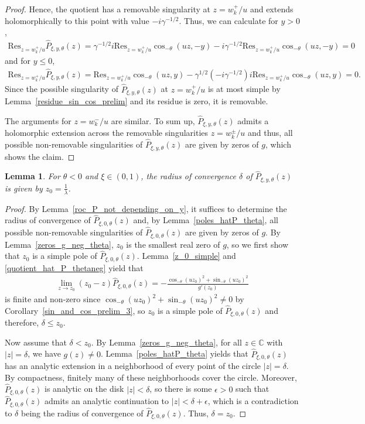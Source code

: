 \documentclass[12pt]{article}
\newcommand{\C}{\mathbb{C}} %
\newcommand{\1}{\mathds{1}}
\theoremstyle{definition}
\theoremstyle{plain}
\newtheorem{Lemma}[definition]{Lemma}
\theoremstyle{remark}
\begin{document}
\begin{proof}
Hence, the quotient has a removable singularity at $z= w_k^+/u$ and extends holomorphically to this point with value $-i\gamma^{-1/2}$. Thus, we can calculate for $y>0$,
\begin{align*}
   \mathrm{Res}_{z=w_k^+/u}\hat{P}_{\xi,y,\theta}(z)=\gamma^{-1/2}i\mathrm{Res}_{z=w_k^+/u}\cos_{-\theta}(uz,-y)-i\gamma^{-1/2}\mathrm{Res}_{z=w_k^+/u}\cos_{-\theta}(uz,-y)=0
\end{align*}
and for $y\le 0$,
\begin{align*}
   \mathrm{Res}_{z=w_k^+/u}\hat{P}_{\xi,y,\theta}(z)=\mathrm{Res}_{z=w_k^+/u}\cos_{-\theta}(uz,y)-\gamma^{1/2}(-i\gamma^{-1/2})i\mathrm{Res}_{z=w_k^+/u}\cos_{-\theta}(uz,y)=0.
\end{align*}
Since the possible singularity of $\hat{P}_{\xi,y,\theta}(z)$ at $z=w_k^+/u$ is at most simple by Lemma~\ref{residue_sin_cos_prelim} and its residue is zero, it is removable.

The arguments for $z=w_k^-/u$ are similar. To sum up, $\hat{P}_{\xi,y,\theta}(z)$ admits a holomorphic extension across the removable singularities $z=w_k^\pm/u$ and thus, all possible non-removable singularities of $\hat{P}_{\xi,y,\theta}(z)$ are given by zeros of $g$, which shows the claim.
\end{proof}
\begin{Lemma}\label{roc_hatP_theta_le-1}
     For $\theta<0$ and $\xi\in(0,1)$, the radius of convergence $\delta$ of $\hat{P}_{\xi,y,\theta}(z)$ is given by $z_0=\frac{1}{\lambda}$.
\end{Lemma}
\begin{proof}
    By Lemma~\ref{roc_P_not_depending_on_y}, it suffices to determine the radius of convergence of $\hat{P}_{\xi,0,\theta}(z)$ and, by Lemma~\ref{poles_hatP_theta}, all possible non-removable singularities of $\hat{P}_{\xi,0,\theta}(z)$ are given by zeros of $g$. 
   By Lemma~\ref{zeros_g_neg_theta}, $z_0$ is the smallest real zero of $g$, so we first show that $z_0$ is a simple pole of $\hat{P}_{\xi,0,\theta}(z)$.
 Lemma~\ref{z_0_simple} and \eqref{quotient_hat_P_thetaneg} yield that
\begin{align*}
    \lim_{z\to z_0}\left(z_0-z\right)\hat{P}_{\xi,0,\theta}(z)=-\frac{\cos_{-\theta}(uz_0)^2+\sin_{-\theta}(uz_0)^2}{g'(z_0)}
\end{align*}
 is finite and non-zero since $\cos_{-\theta}(uz_0)^2+\sin_{-\theta}(uz_0)^2\neq 0$ by Corollary~\ref{sin_and_cos_prelim_3}, so $z_0$ is a simple pole of $\hat{P}_{\xi,0,\theta}(z)$ and therefore, $\delta\leq z_0$. 

Now assume that $\delta <z_0$. 
By Lemma~\ref{zeros_g_neg_theta}, for all $z\in\C$ with $|z|=\delta$, we have $g(z)\neq 0$. Lemma~\ref{poles_hatP_theta} yields that $\hat{P}_{\xi,0,\theta}(z)$ has an analytic extension in a neighborhood of every point of the circle $|z|=\delta$. By compactness, finitely many of these neighborhoods cover the circle. Moreover, $\hat{P}_{\xi,0,\theta}(z)$ is analytic on the disk $|z|<\delta$, so there is some $\epsilon >0$ such that $\hat{P}_{\xi,0,\theta}(z)$ admits an analytic continuation to $|z|<\delta+\epsilon$, which is a contradiction to $\delta$ being the radius of convergence of $\hat{P}_{\xi,0,\theta}(z)$. Thus, $\delta=z_0$.
\end{proof}
\end{document}
